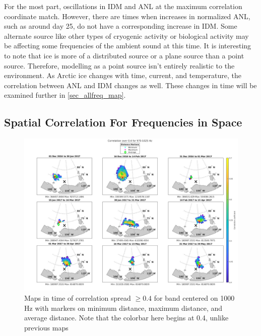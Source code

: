 For the most part, oscillations in IDM and ANL at the maximum correlation coordinate match. However, there are times when increases in normalized ANL, such as around day 25, do not have a corresponding increase in IDM. Some alternate source like other types of cryogenic activity \parencite{collins2019acoustic} or biological activity may be affecting some frequencies of the ambient sound at this time. It is interesting to note that ice is more of a distributed source or a plane source than a point source. Therefore, modelling as a point source isn't entirely realistic to the environment. As Arctic ice changes with time, current, and temperature, the correlation between ANL and IDM changes as well. These changes in time will be examined further in \autoref{sec_allfreq_map}.



\subsection{Spatial Correlation For Frequencies in Space}  \label{sec_allfreq_map}
 
\begin{figure}[p]
\centering
\includegraphics[scale=0.24]{Figures/megamap_noisland_0.4_1000.jpg}
\caption{Maps in time of correlation spread $\geq 0.4$ for band centered on 1000 Hz with markers on minimum distance, maximum distance, and average distance. Note that the colorbar here begins at 0.4, unlike previous maps}
\label{fig_megamap}
\end{figure}


